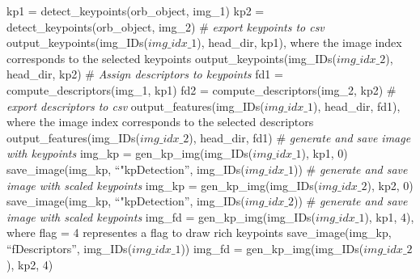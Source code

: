 \documentclass[12pt, titlepage]{article}
\begin{document}
kp1 = detect\_keypoints(orb\_object, img\_1)\newline 
kp2 = detect\_keypoints(orb\_object, img\_2)\newline \newline
\# \textit{export keypoints to csv} \newline 
output\_keypoints(img\_IDs($img\_idx\_{1}$), head\_dir, kp1), where the image index corresponds to the selected keypoints \newline
output\_keypoints(img\_IDs($img\_idx\_{2}$), head\_dir, kp2) \newline \newline
\# \textit{Assign descriptors to keypoints} \newline 
fd1 = compute\_descriptors(img\_1, kp1)\newline 
fd2 = compute\_descriptors(img\_2, kp2)\newline \newline
\# \textit{export descriptors to csv} \newline
output\_features(img\_IDs($img\_idx\_{1}$), head\_dir, fd1), where the image index corresponds to the selected descriptors \newline
output\_features(img\_IDs($img\_idx\_{2}$), head\_dir, fd1) \newline \newline
\# \textit{generate and save image with keypoints} \newline 
img\_kp = gen\_kp\_img(img\_IDs($img\_idx\_{1}$), kp1, 0)\newline
save\_image(img\_kp, ``"kpDetection'', img\_IDs($img\_idx\_{1}$))\newline \newline
\# \textit{generate and save image with scaled keypoints} \newline 
img\_kp = gen\_kp\_img(img\_IDs($img\_idx\_{2}$), kp2, 0)\newline
save\_image(img\_kp, ``"kpDetection'', img\_IDs($img\_idx\_{2}$))\newline \newline
\# \textit{generate and save image with scaled keypoints} \newline
img\_fd = gen\_kp\_img(img\_IDs($img\_idx\_{1}$), kp1, 4), where flag = 4 representes a flag to draw rich keypoints\newline
save\_image(img\_kp, ``fDescriptors'', img\_IDs($img\_idx\_{1}$))\newline \newline
img\_fd = gen\_kp\_img(img\_IDs($img\_idx\_{2}$), kp2, 4)\newline
\end{document}

